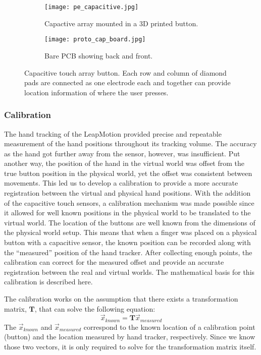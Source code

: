 \begin{figure}
    \begin{subfigure}[t]{0.32\linewidth}
    \centering
    \texttt{[image: pe\_capacitive.jpg]}
    \caption{Capactive array mounted in a 3D printed button.}
    \label{fig:proto_capacitive_array:mounted}
    \end{subfigure}
    \begin{subfigure}[t]{0.64\linewidth}
    \centering
        \texttt{[image: proto\_cap\_board.jpg]}
    \caption{Bare PCB showing back and front.}
    \label{fig:proto_capacitive_array:pcb}
    \end{subfigure}
    \caption{Capacitive touch array button. Each row and column of diamond pads are connected as one electrode each and together can provide location information of where the user presses.}
    \label{fig:proto_capacitive_array}
\end{figure}

\subsubsection{Calibration}

The hand tracking of the LeapMotion provided precise and repeatable measurement of the hand positions throughout its tracking volume.
The accuracy as the hand got further away from the sensor, however, was insufficient.
Put another way, the position of the hand in the virtual world was offset from the true button position in the physical world, yet the offset was consistent between movements.
This led us to develop a calibration to provide a more accurate registration between the virtual and physical hand positions.
With the addition of the capacitive touch sensors, a calibration mechanism was made possible since it allowed for well known positions in the physical world to be translated to the virtual world.
The location of the buttons are well known from the dimensions of the physical world setup.
This means that when a finger was placed on a physical button with a capacitive sensor, the known position can be recorded along with the ``measured'' position of the hand tracker.
After collecting enough points, the calibration can correct for the measured offset and provide an accurate registration between the real and virtual worlds.
The mathematical basis for this calibration is described here.

The calibration works on the assumption that there exists a transformation matrix, $\mathbf{T}$, that can solve the following equation:
\begin{equation}
    \vec{x}_{known} = \mathbf{T}\vec{x}_{measured}
    \label{eq:proto_Tvec}
\end{equation}
The $\vec{x}_{known}$ and $\vec{x}_{measured}$ correspond to the known location of a calibration point (button) and the location measured by hand tracker, respectively.
Since we know those two vectors, it is only required to solve for the transformation matrix itself.

